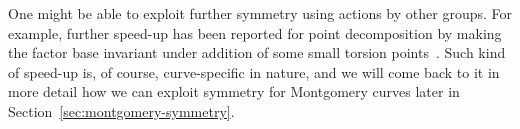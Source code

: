 One might be able to exploit further symmetry using actions by other
groups.
%
For example, further speed-up has been reported for point
decomposition by making the factor base invariant under addition of
some small torsion
points~\cite{DBLP:conf/eurocrypt/FaugereHJRV14,DBLP:conf/indocrypt/GalbraithG14}.
%
Such kind of speed-up is, of course, curve-specific in nature, and we
will come back to it in more detail how we can exploit symmetry for
Montgomery curves later in Section~\ref{sec:montgomery-symmetry}.
